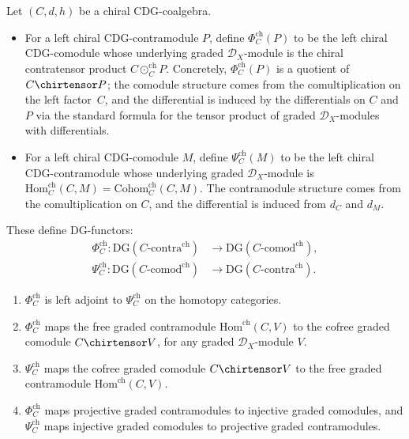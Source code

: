 \begin{definition}
\label{def:chiral-Phi-Psi}
Let $(C, d, h)$ be a chiral CDG-coalgebra.
\begin{itemize}
\item For a left chiral CDG-contramodule $P$, define
  $\Phi_C^{\mathrm{ch}}(P)$ to be the left chiral CDG-comodule
  whose underlying graded $\mathcal{D}_X$-module is the
  chiral contratensor product $C \odot_C^{\mathrm{ch}} P$.
  Concretely, $\Phi_C^{\mathrm{ch}}(P)$ is a quotient of
  $C \chirtensor P$; the comodule structure comes from the
  comultiplication on the left factor~$C$, and the differential is
  induced by the differentials on $C$ and $P$ via the standard
  formula for the tensor product of graded $\mathcal{D}_X$-modules
  with differentials.
\item For a left chiral CDG-comodule $M$, define
  $\Psi_C^{\mathrm{ch}}(M)$ to be the left chiral CDG-contramodule
  whose underlying graded $\mathcal{D}_X$-module is
  $\mathrm{Hom}_C^{\mathrm{ch}}(C, M) = \mathrm{Cohom}_C^{\mathrm{ch}}(C, M)$.
  The contramodule structure comes from the comultiplication
  on $C$, and the differential is induced from $d_C$ and $d_M$.
\end{itemize}
These define DG-functors:
\begin{align*}
\Phi_C^{\mathrm{ch}}\colon \mathrm{DG}(C\text{-}\mathrm{contra}^{\mathrm{ch}})
&\longrightarrow \mathrm{DG}(C\text{-}\mathrm{comod}^{\mathrm{ch}}), \\
\Psi_C^{\mathrm{ch}}\colon \mathrm{DG}(C\text{-}\mathrm{comod}^{\mathrm{ch}})
&\longrightarrow \mathrm{DG}(C\text{-}\mathrm{contra}^{\mathrm{ch}}).
\end{align*}
\end{definition}

\begin{lemma}
\label{lem:Phi-Psi-properties}
\begin{enumerate}[label=\textup{(\alph*)}]
\item $\Phi_C^{\mathrm{ch}}$ is left adjoint to $\Psi_C^{\mathrm{ch}}$
  on the homotopy categories.
\item $\Phi_C^{\mathrm{ch}}$ maps the free graded contramodule
  $\mathrm{Hom}^{\mathrm{ch}}(C, V)$ to the cofree graded comodule
  $C \chirtensor V$, for any graded $\mathcal{D}_X$-module $V$.
\item $\Psi_C^{\mathrm{ch}}$ maps the cofree graded comodule
  $C \chirtensor V$ to the free graded contramodule
  $\mathrm{Hom}^{\mathrm{ch}}(C, V)$.
\item $\Phi_C^{\mathrm{ch}}$ maps projective graded contramodules
  to injective graded comodules, and $\Psi_C^{\mathrm{ch}}$ maps
  injective graded comodules to projective graded contramodules.
\end{enumerate}
\end{lemma}

